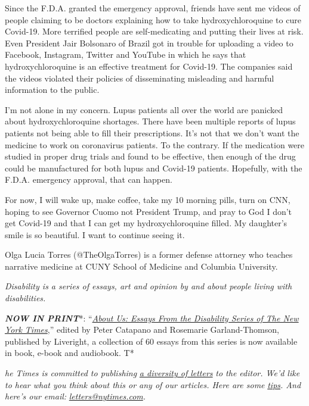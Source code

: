 Since the F.D.A. granted the emergency approval, friends have sent me
videos of people claiming to be doctors explaining how to take
hydroxychloroquine to cure Covid-19. More terrified people are
self-medicating and putting their lives at risk. Even President Jair
Bolsonaro of Brazil got in trouble for uploading a video to Facebook,
Instagram, Twitter and YouTube in which he says that hydroxychloroquine
is an effective treatment for Covid-19. The companies said the videos
violated their policies of disseminating misleading and harmful
information to the public.

I'm not alone in my concern. Lupus patients all over the world are
panicked about hydroxychloroquine shortages. There have been multiple
reports of lupus patients not being able to fill their prescriptions.
It's not that we don't want the medicine to work on coronavirus
patients. To the contrary. If the medication were studied in proper drug
trials and found to be effective, then enough of the drug could be
manufactured for both lupus and Covid-19 patients. Hopefully, with the
F.D.A. emergency approval, that can happen.

For now, I will wake up, make coffee, take my 10 morning pills, turn on
CNN, hoping to see Governor Cuomo not President Trump, and pray to God I
don't get Covid-19 and that I can get my hydroxychloroquine filled. My
daughter's smile is so beautiful. I want to continue seeing it.

Olga Lucia Torres (@TheOlgaTorres) is a former defense attorney who
teaches narrative medicine at CUNY School of Medicine and Columbia
University.

\emph{Disability is a series of essays, art and opinion by and about
people living with disabilities.}

\emph{\textbf{NOW IN PRINT}}*:
``\emph{\href{https://www.aboutusbook.com/}{\emph{About Us: Essays From
the Disability Series of The New York Times}}},'' edited by Peter
Catapano and Rosemarie Garland-Thomson, published by Liveright, a
collection of 60 essays from this series is now available in book,
e-book and audiobook. T*

\emph{he Times is committed to publishing}
\href{https://www.nytimes.com/2019/01/31/opinion/letters/letters-to-editor-new-york-times-women.html}{\emph{a
diversity of letters}} \emph{to the editor. We'd like to hear what you
think about this or any of our articles. Here are some}
\href{https://help.nytimes.com/hc/en-us/articles/115014925288-How-to-submit-a-letter-to-the-editor}{\emph{tips}}\emph{.
And here's our email:}
\href{mailto:letters@nytimes.com}{\emph{letters@nytimes.com}}\emph{.}

